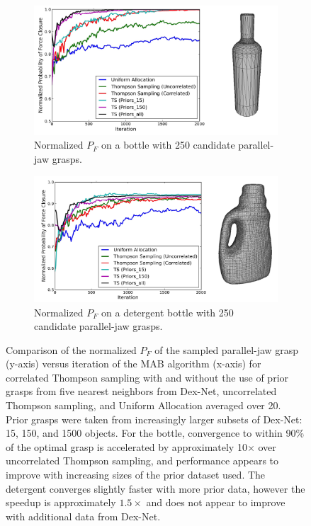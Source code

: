 \begin{figure}[t!]
\centering
\begin{subfigure}[b]{0.5\textwidth}
        \centering
        \includegraphics[scale=0.08]{figures/bottle_avg_reward_w_model2.jpg}
        \caption{Normalized $P_F$ on a bottle with 250 candidate parallel-jaw grasps.}
    \end{subfigure}
    \begin{subfigure}[b]{0.5\textwidth}
        \centering
        \includegraphics[scale=0.08]{figures/detergent_avg_reward_w_model.jpg}
        \caption{Normalized $P_F$ on a detergent bottle with 250 candidate parallel-jaw grasps.}
    \end{subfigure}
\caption{Comparison of the normalized $P_F$ of the sampled parallel-jaw grasp (y-axis) versus iteration of the MAB algorithm (x-axis) for correlated Thompson sampling with and without the use of prior grasps from five nearest neighbors from Dex-Net, uncorrelated Thompson sampling, and Uniform Allocation averaged over 20. Prior grasps were taken from increasingly larger subsets of Dex-Net: 15, 150, and 1500 objects. For the bottle, convergence to within 90\% of the optimal grasp is accelerated by approximately 10$\times$ over uncorrelated Thompson sampling, and performance appears to improve with increasing sizes of the prior dataset used. The detergent converges slightly faster with more prior data, however the speedup is approximately $1.5\times$ and does not appear to improve with additional data from Dex-Net.}
\vspace*{-15pt}
\end{figure}

